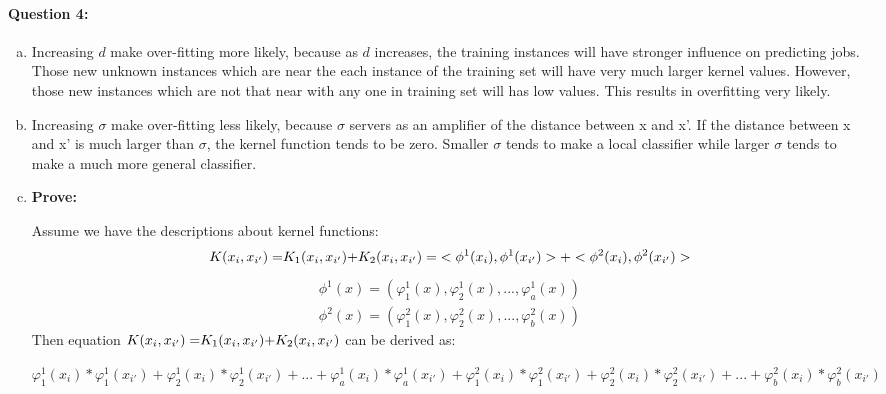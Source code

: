 \documentclass[letterpaper,11pt]{article}
\begin{document}
\paragraph{Question 4:}
\begin{enumerate}[(a)]
\item \begin{enumerate}
Increasing $d$ make over-fitting more likely, because as $d$ increases, the training instances will have stronger influence on predicting jobs. Those new unknown instances which are near the each instance of the training set will have very much larger kernel values. However, those new instances which are not that near with any one in training set will has low values. This results in overfitting very likely.
\end{enumerate}

\item \begin{enumerate}
Increasing $\sigma$ make over-fitting less likely, because $\sigma$ servers as an amplifier of the distance between x and x'. If the distance between x and x' is much larger than $\sigma$, the kernel function tends to be zero. Smaller $\sigma$ tends to make a local classifier while larger $\sigma$ tends to make a much more general classifier.
\end{enumerate}

\item \begin{enumerate}
{\bf Prove:}

Assume we have the descriptions about kernel functions:
\begin{eqnarray}
K({x_i},{x_{i'}}{\rm{)  = }}{K_1}({x_i},{x_{i'}}{\rm{)  + }}{K_2}({x_i},{x_{i'}}{\rm{)  = }} < {\phi ^1}({x_i}),{\phi ^1}({x_{i'}}) >  +  < {\phi ^2}({x_i}),{\phi ^2}({x_{i'}}) >
\end{eqnarray}
\begin{eqnarray}
{\phi ^1}(x) = (\varphi _1^1(x),\varphi _2^1(x),...,\varphi _a^1(x))
\end{eqnarray}
\begin{eqnarray}
{\phi ^2}(x) = (\varphi _1^2(x),\varphi _2^2(x),...,\varphi _b^2(x))
\end{eqnarray}
Then equation $K({x_i},{x_{i'}}{\rm{)  = }}{K_1}({x_i},{x_{i'}}{\rm{)  + }}{K_2}({x_i},{x_{i'}}{\rm{)}}$ can be derived as: 

$\varphi _1^1({x_i})*\varphi _1^1({x_{i'}}) + \varphi _2^1({x_i})*\varphi _2^1({x_{i'}}) + ... + \varphi _a^1({x_i})*\varphi _a^1({x_{i'}}) + \varphi _1^2({x_i})*\varphi _1^2({x_{i'}}) + \varphi _2^2({x_i})*\varphi _2^2({x_{i'}}) + ... + \varphi _b^2({x_i})*\varphi _b^2({x_{i'}})$


\end{enumerate}
\end{enumerate}
\end{document}
